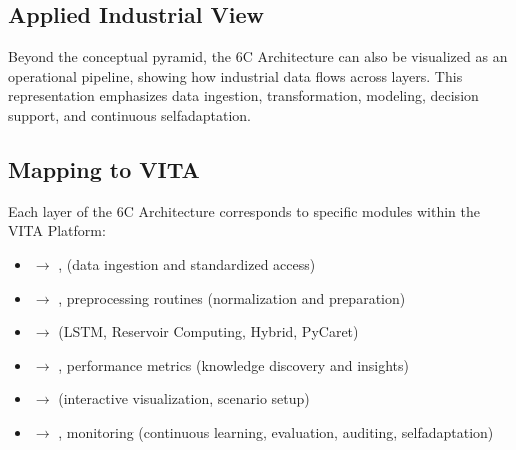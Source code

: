 \documentclass[letterpaper,10pt,english]{sphinxmanual}
\begin{document}


\subsection{Applied Industrial View}
\label{\detokenize{architecture6c:applied-industrial-view}}
\sphinxAtStartPar
Beyond the conceptual pyramid, the 6C Architecture can also be visualized as an operational
pipeline, showing how industrial data flows across layers. This representation emphasizes
data ingestion, transformation, modeling, decision support, and continuous self\sphinxhyphen{}adaptation.



\subsection{Mapping to VITA}
\label{\detokenize{architecture6c:mapping-to-vita}}
\sphinxAtStartPar
Each layer of the 6C Architecture corresponds to specific modules within the VITA Platform:
\begin{itemize}
\item {} 
\sphinxAtStartPar
{} \(\rightarrow\) ,  (data ingestion and standardized access)

\item {} 
\sphinxAtStartPar
{} \(\rightarrow\) , preprocessing routines (normalization and preparation)

\item {} 
\sphinxAtStartPar
{} \(\rightarrow\)  (LSTM, Reservoir Computing, Hybrid, PyCaret)

\item {} 
\sphinxAtStartPar
{} \(\rightarrow\) , performance metrics (knowledge discovery and insights)

\item {} 
\sphinxAtStartPar
{} \(\rightarrow\)  (interactive visualization, scenario setup)

\item {} 
\sphinxAtStartPar
{} \(\rightarrow\) , monitoring (continuous learning, evaluation, auditing, self\sphinxhyphen{}adaptation)

\end{itemize}
\end{document}
